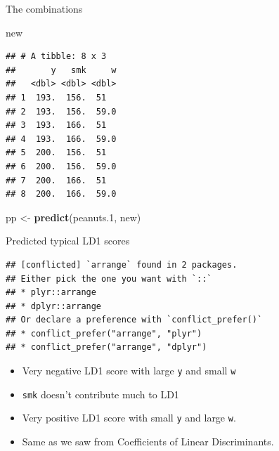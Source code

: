 \documentclass[ignorenonframetext,]{beamer}
\newenvironment{Shaded}{\begin{snugshade}}{\end{snugshade}}
\newcommand{\FloatTok}[1]{\textcolor[rgb]{0.00,0.00,0.81}{#1}}
\newcommand{\KeywordTok}[1]{\textcolor[rgb]{0.13,0.29,0.53}{\textbf{#1}}}
\newcommand{\NormalTok}[1]{#1}
\newcommand{\OperatorTok}[1]{\textcolor[rgb]{0.81,0.36,0.00}{\textbf{#1}}}
\newcommand{\StringTok}[1]{\textcolor[rgb]{0.31,0.60,0.02}{#1}}
\begin{document}
\begin{frame}[fragile]{The combinations}
\protect\hypertarget{the-combinations}{}

\begin{Shaded}
\begin{Highlighting}[]
\NormalTok{new}
\end{Highlighting}
\end{Shaded}

\begin{verbatim}
## # A tibble: 8 x 3
##       y   smk     w
##   <dbl> <dbl> <dbl>
## 1  193.  156.  51  
## 2  193.  156.  59.0
## 3  193.  166.  51  
## 4  193.  166.  59.0
## 5  200.  156.  51  
## 6  200.  156.  59.0
## 7  200.  166.  51  
## 8  200.  166.  59.0
\end{verbatim}

\begin{Shaded}
\begin{Highlighting}[]
\NormalTok{pp <-}\StringTok{ }\KeywordTok{predict}\NormalTok{(peanuts}\FloatTok{.1}\NormalTok{, new)}
\end{Highlighting}
\end{Shaded}

\end{frame}

\begin{frame}[fragile]{Predicted typical LD1 scores}
\protect\hypertarget{predicted-typical-ld1-scores}{}

\begin{Shaded}
\end{Shaded}

\begin{verbatim}
## [conflicted] `arrange` found in 2 packages.
## Either pick the one you want with `::` 
## * plyr::arrange
## * dplyr::arrange
## Or declare a preference with `conflict_prefer()`
## * conflict_prefer("arrange", "plyr")
## * conflict_prefer("arrange", "dplyr")
\end{verbatim}

\begin{itemize}
\item
  Very negative LD1 score with large \texttt{y} and small \texttt{w}
\item
  \texttt{smk} doesn't contribute much to LD1
\item
  Very positive LD1 score with small \texttt{y} and large \texttt{w}.
\item
  Same as we saw from Coefficients of Linear Discriminants.
\end{itemize}

\end{frame}
\end{document}
